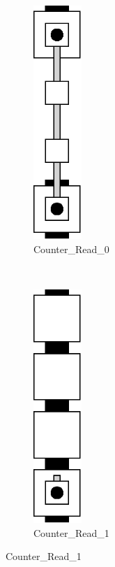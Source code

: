        \begin{figure}[H]
            \centering
            \begin{subfigure}[t]{0.2\textwidth}
                \centering
                \includegraphics[width=0.2\textwidth]{read/read_0}
                \caption{\label{fig:read/read_1} Counter\_Read\_0}
            \end{subfigure}%
            ~
            \begin{subfigure}[t]{0.2\textwidth}
                \centering
                \includegraphics[width=0.2\textwidth]{read/read_1}
                \caption{\label{fig:read/read_1} Counter\_Read\_1}
            \end{subfigure}%
        \end{figure}

